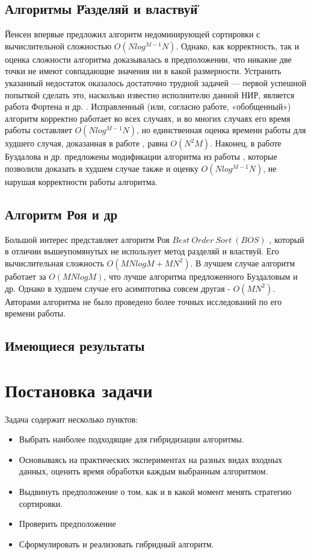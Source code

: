 \subsection{Алгоритмы \"Разделяй и властвуй\"}

Йенсен \cite{Jensen} впервые предложил алгоритм недоминирующей сортировки с вычислительной сложностью
$O(N log^{M-1} N)$. Однако, как корректность, так и оценка сложности алгоритма доказывалась в предположении,
что никакие две точки не имеют совпадающие значения ни в какой размерности. Устранить указанный недостаток оказалось
достаточно трудной задачей — первой успешной попыткой сделать это, насколько известно исполнителю данной НИР,
является работа Фортена и др. \cite{Forton}. Исправленный (или, согласно работе, «обобщенный») алгоритм корректно
работает во всех случаях, и во многих случаях его время работы составляет $O(N log^{M-1} N)$, но единственная оценка
времени работы для худшего случая, доказанная в работе \cite{Jensen}, равна $O(N^2M)$. Наконец, в работе Буздалова
и др. \cite{Buzdalov} предложены модификации алгоритма из работы \cite{Jensen}, которые позволили доказать в худшем
случае также и оценку $O(N log^{M-1} N)$, не нарушая корректности работы алгоритма.

\subsection{Алгоритм Роя и др}

Большой интерес представляет алгоритм Роя $Best~Order~Sort~(BOS)$ \cite{Roy}, который в отличии вышеупомянутых не
использует метод разделяй и властвуй. Его вычислительная сложность $O(MNlogM+MN^2)$. В лучшем случае алгоритм
работает за $O(MNlogM)$, что лучше алгоритма предложенного Буздаловым и др. Однако в худшем случае его асимптотика
совсем другая - $O(MN^2)$. Авторами алгоритма не было проведено более точных исследований по его времени работы.


\subsection{Имеющиеся результаты}

\section{Постановка задачи}

Задача содержит несколько пунктов: 
\begin{itemize}
	\item Выбрать наиболее подходящие для гибридизации алгоритмы.
	\item Основываясь на практических экспериментах на разных видах входных данных, оценить время обработки каждым
	выбранным алгоритмом.
	\item Выдвинуть предположение о том, как и в какой момент менять стратегию сортировки. 
	\item Проверить предположение
	\item Сформулировать и реализовать гибридный алгоритм.
\end{itemize}
